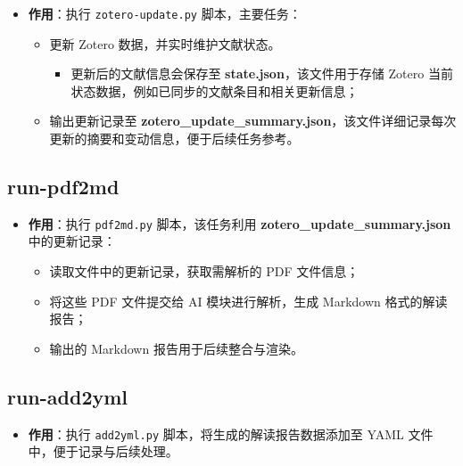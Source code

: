 \documentclass[
  letterpaper,
  DIV=11,
  numbers=noendperiod]{scrreprt}
\providecommand{\tightlist}{%
  \setlength{\itemsep}{0pt}\setlength{\parskip}{0pt}}\usepackage{longtable,booktabs,array}
\begin{document}
\begin{itemize}
\tightlist
\item
  \textbf{作用}：执行 \texttt{zotero-update.py} 脚本，主要任务：

  \begin{itemize}
  \tightlist
  \item
    更新 Zotero 数据，并实时维护文献状态。

    \begin{itemize}
    \tightlist
    \item
      更新后的文献信息会保存至 \textbf{state.json}，该文件用于存储
      Zotero 当前状态数据，例如已同步的文献条目和相关更新信息；\\
    \end{itemize}
  \item
    输出更新记录至
    \textbf{zotero\_update\_summary.json}，该文件详细记录每次更新的摘要和变动信息，便于后续任务参考。
  \end{itemize}
\end{itemize}

\subsection{run-pdf2md}\label{run-pdf2md}

\begin{itemize}
\tightlist
\item
  \textbf{作用}：执行 \texttt{pdf2md.py} 脚本，该任务利用
  \textbf{zotero\_update\_summary.json} 中的更新记录：

  \begin{itemize}
  \tightlist
  \item
    读取文件中的更新记录，获取需解析的 PDF 文件信息；\\
  \item
    将这些 PDF 文件提交给 AI 模块进行解析，生成 Markdown
    格式的解读报告；\\
  \item
    输出的 Markdown 报告用于后续整合与渲染。
  \end{itemize}
\end{itemize}

\subsection{run-add2yml}\label{run-add2yml}

\begin{itemize}
\tightlist
\item
  \textbf{作用}：执行 \texttt{add2yml.py}
  脚本，将生成的解读报告数据添加至 YAML 文件中，便于记录与后续处理。
\end{itemize}
\end{document}
